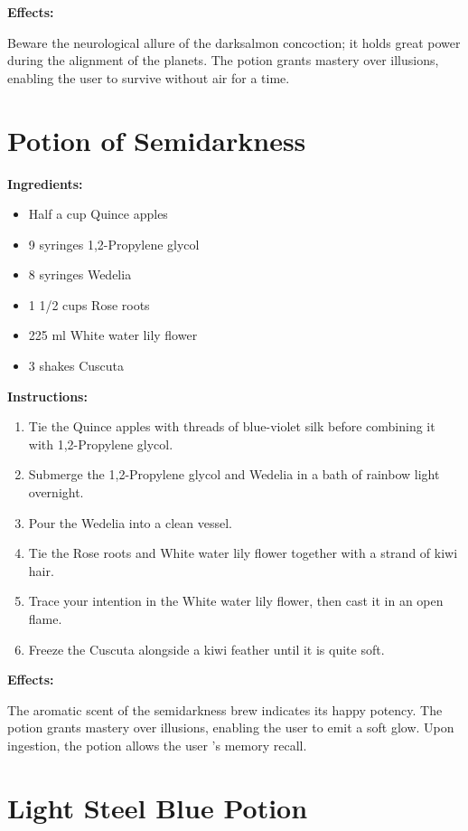 \documentclass{article}
\begin{document}
\textbf{Effects:}

Beware the neurological allure of the darksalmon concoction; it holds great power during the alignment of the planets. The potion grants mastery over illusions, enabling the user to survive without air for a time.

\newpage
\section*{Potion of Semidarkness}

\textbf{Ingredients:}

\begin{itemize}
  \item Half a cup Quince apples
  \item 9 syringes 1,2-Propylene glycol
  \item 8 syringes Wedelia
  \item 1 1/2 cups Rose roots
  \item 225 ml White water lily flower
  \item 3 shakes Cuscuta
\end{itemize}

\textbf{Instructions:}

\begin{enumerate}
  \item Tie the Quince apples with threads of blue-violet silk before combining it with 1,2-Propylene glycol.
  \item Submerge the 1,2-Propylene glycol and Wedelia in a bath of rainbow light overnight.
  \item Pour the Wedelia into a clean vessel.
  \item Tie the Rose roots and White water lily flower together with a strand of kiwi hair.
  \item Trace your intention in the White water lily flower, then cast it in an open flame.
  \item Freeze the Cuscuta alongside a kiwi feather until it is quite soft.
\end{enumerate}

\textbf{Effects:}

The aromatic scent of the semidarkness brew indicates its happy potency. The potion grants mastery over illusions, enabling the user to emit a soft glow. Upon ingestion, the potion allows the user 's memory recall.

\newpage
\section*{Light Steel Blue Potion}
\end{document}
